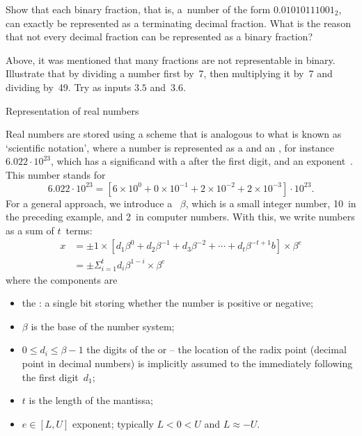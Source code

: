 \begin{exercise}
  Show that each binary fraction, that is,
  a~number of the form $0.01010111001_2$,
  can exactly be represented as a
  terminating decimal fraction. What is the reason that not every
  decimal fraction can be represented as a binary fraction?
\end{exercise}

\begin{exercise}
  \label{ex:fraction-code}
  Above, it was mentioned that many fractions are not
  representable in binary. Illustrate that by dividing a
  number first by~7, then multiplying it by~7 and dividing
  by~49. Try as inputs $3.5$ and~$3.6$.
\end{exercise}

 {Representation of real numbers}
\label{sec:float-representation}

Real numbers are stored using a scheme that is analogous to what is
known as `scientific notation', where a number is represented as a
 and an , for
instance~$6.022\cdot 10^{23}$, which has a significand  with a
 after the first digit, and an exponent~.
This number stands for
\begin{equation}
  6.022\cdot 10^{23}= \left[
    6\times 10^0+0\times 10^{-1}+2\times10^{-2}+2\times10^{-3}
    \right] \cdot 10^{23}. 
\end{equation}
For a general approach,
we introduce a ~$\beta$, which is
a small integer number, 10~in the preceding example, and 2~in computer
numbers.
With this, we write numbers as a sum of $t$~terms:
\begin{equation}
  \begin{array}{rl}
    x &= \pm 1 \times
    \left[ d_1\beta^0+d_2\beta^{-1}+d_3\beta^{-2}+\cdots+d_t\beta^{-t+1}b\right]
    \times \beta^e \\
    & = \pm \Sigma_{i=1}^t d_i\beta^{1-i}  \times\beta^e
  \end{array}
  \label{eq:floatingpoint-def}
\end{equation}
where the components are
\begin{itemize}
\item the : a single bit storing whether the
  number is positive or negative;
\item $\beta$ is the base of the number system;
\item $0\leq d_i\leq \beta-1$ the digits of the 
  or  -- the location of the radix point
  (decimal point in decimal numbers) is implicitly assumed to the
  immediately following the first digit~$d_1$;
\item $t$ is the length of the mantissa;
\item $e\in [L,U]$ exponent; typically $L<{0}<{U} $ and $L\approx-U$.
\end{itemize}

